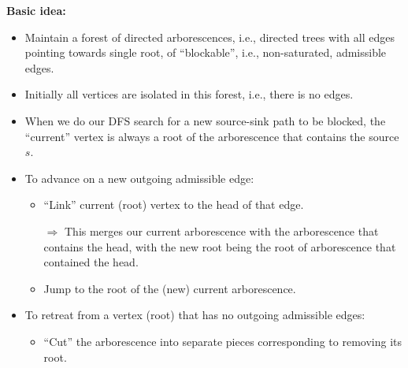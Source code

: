 \documentclass{article}
\begin{document}
\textbf{Basic idea:}
\begin{itemize}
\item Maintain a forest of directed arborescences, i.e., directed trees with all edges pointing towards single root, of ``blockable'', i.e., non-saturated, admissible edges.
\item Initially all vertices are isolated in this forest, i.e., there is no edges.
\item When we do our DFS search for a new source-sink path to be blocked, the ``current'' vertex is always a root of the arborescence that contains the source $s$.
\item To advance on a new outgoing admissible edge:
\begin{itemize}
\item ``Link'' current (root) vertex to the head of that edge.

$\Rightarrow$ This merges our current arborescence with the arborescence that contains the head, with the new root being the root of arborescence that contained the head.
\item Jump to the root of the (new) current arborescence.
\end{itemize}
\item To retreat from a vertex (root) that has no outgoing admissible edges:
\begin{itemize}
\item ``Cut'' the arborescence into separate pieces corresponding to removing its root. 


\end{itemize}
\end{itemize}
\end{document}
